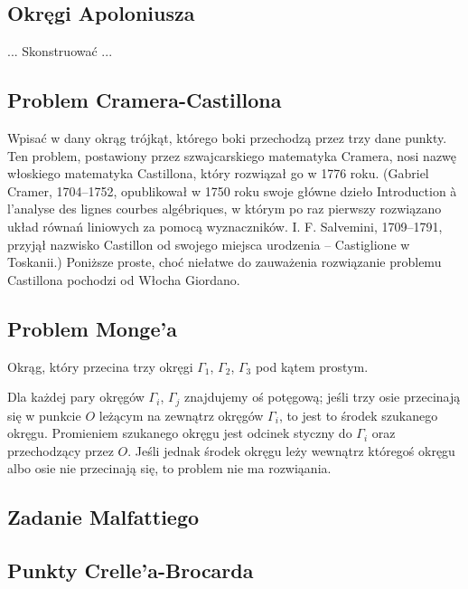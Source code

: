 \subsection{Okręgi Apoloniusza}
\begin{problem}
    \label{problem_apolloniusza}%
    ...
    Skonstruować ...
\end{problem}

\subsection{Problem Cramera-Castillona}
Wpisać w dany okrąg trójkąt, którego boki przechodzą przez trzy dane punkty.
Ten problem, postawiony przez szwajcarskiego matematyka Cramera, nosi nazwę włoskiego matematyka Castillona, który rozwiązał go w 1776 roku.
(Gabriel Cramer, 1704–1752, opublikował w 1750 roku swoje główne dzieło Introduction à l’analyse des lignes courbes algébriques, w którym po raz pierwszy rozwiązano układ równań liniowych za pomocą wyznaczników.
I. F. Salvemini, 1709–1791, przyjął nazwisko Castillon od swojego miejsca urodzenia – Castiglione w Toskanii.)
Poniższe proste, choć niełatwe do zauważenia rozwiązanie problemu Castillona pochodzi od Włocha Giordano.

\subsection{Problem Monge'a}
\begin{problem}[Monge'a?]
    Okrąg, który przecina trzy okręgi $\Gamma_1$, $\Gamma_2$, $\Gamma_3$ pod kątem prostym.
\end{problem}

Dla każdej pary okręgów $\Gamma_i$, $\Gamma_j$ znajdujemy oś potęgową; jeśli trzy osie przecinają się w punkcie $O$ leżącym na zewnątrz okręgów $\Gamma_i$, to jest to środek szukanego okręgu.
Promieniem szukanego okręgu jest odcinek styczny do $\Gamma_i$ oraz przechodzący przez $O$.
Jeśli jednak środek okręgu leży wewnątrz któregoś okręgu albo osie nie przecinają się, to problem nie ma rozwiąania.

\subsection{Zadanie Malfattiego}


\subsection{Punkty Crelle'a-Brocarda}
